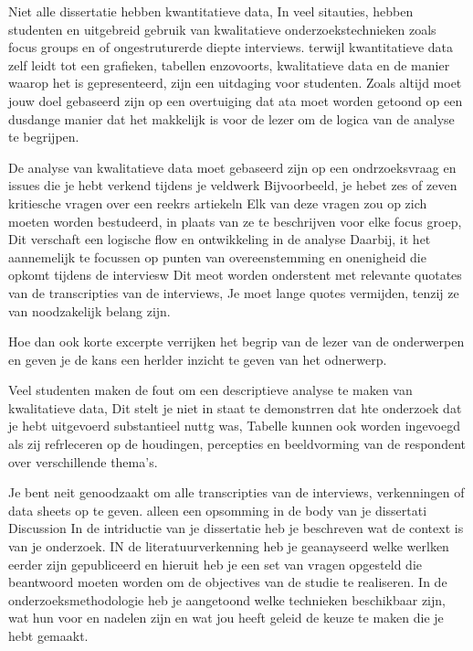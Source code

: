 			
			Niet alle dissertatie hebben kwantitatieve data, In veel sitauties, hebben studenten en uitgebreid gebruik van kwalitatieve onderzoekstechnieken zoals focus groups en of ongestruturerde diepte interviews. terwijl kwantitatieve data zelf leidt tot een grafieken, tabellen enzovoorts, kwalitatieve data en de manier waarop het is gepresenteerd, zijn een uitdaging voor studenten.  Zoals altijd moet jouw doel gebaseerd zijn op een overtuiging dat ata moet worden getoond op een dusdange manier dat het makkelijk is voor de lezer om de logica van de analyse te begrijpen.
			
			
			
			De analyse van kwalitatieve data moet gebaseerd zijn op een ondrzoeksvraag en issues die je hebt verkend tijdens je veldwerk Bijvoorbeeld, je hebet zes of zeven kritiesche vragen over een reekrs artiekeln Elk van deze vragen zou op zich moeten worden bestudeerd, in plaats van ze te beschrijven voor elke focus groep, Dit verschaft een logische flow en ontwikkeling in de analyse
			Daarbij, it het aannemelijk te focussen op punten van overeenstemming en onenigheid die opkomt tijdens de interviesw Dit meot worden onderstent met relevante quotates van de transcripties van de interviews, Je moet lange quotes vermijden, tenzij ze van noodzakelijk belang zijn.
			
			Hoe dan ook korte excerpte verrijken het begrip van de lezer van de onderwerpen en geven je de kans een herlder inzicht te geven van het odnerwerp.
			
			Veel studenten maken de fout om een descriptieve analyse te maken van kwalitatieve data, Dit stelt je niet in staat te demonstrren dat hte onderzoek dat je hebt uitgevoerd substantieel nuttg was, Tabelle kunnen ook worden ingevoegd als zij refrleceren op de houdingen, percepties en beeldvorming van de respondent over verschillende thema's.
			
			
			
			Je bent neit genoodzaakt om alle transcripties van de interviews, verkenningen of data sheets op te geven.  alleen een opsomming in de body van  je dissertati
			Discussion
			In de intriductie van je dissertatie heb je beschreven wat de context is van je onderzoek. IN de literatuurverkenning heb je geanayseerd welke werlken eerder zijn gepubliceerd en hieruit heb je een set van vragen opgesteld die beantwoord moeten worden om de objectives van de studie te realiseren. In de onderzoeksmethodologie heb je aangetoond welke technieken beschikbaar zijn, wat hun voor en nadelen zijn  en wat jou heeft geleid de keuze te maken die je hebt gemaakt.
			

